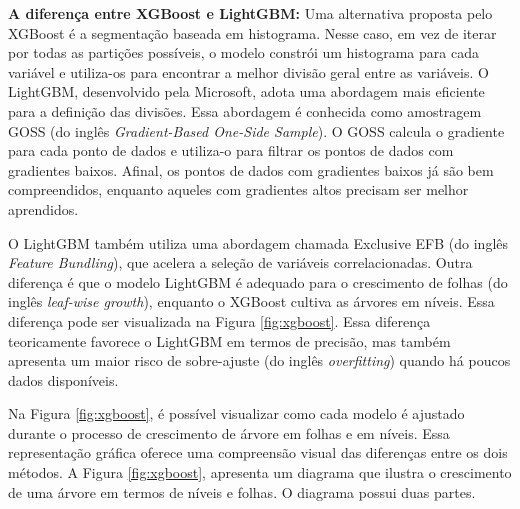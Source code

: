 \noindent\textbf{A diferen\c ca entre XGBoost e LightGBM:}
Uma alternativa proposta pelo XGBoost é a segmentação baseada em histograma. Nesse caso, em vez de iterar por todas as partições possíveis, o modelo constrói um histograma para cada variável e utiliza-os para encontrar a melhor divisão geral entre as variáveis.
O LightGBM, desenvolvido pela Microsoft, adota uma abordagem mais eficiente para a definição das divisões. Essa abordagem é conhecida como amostragem GOSS (do inglês \textit{Gradient-Based One-Side Sample}). O GOSS calcula o gradiente para cada ponto de dados e utiliza-o para filtrar os pontos de dados com gradientes baixos. Afinal, os pontos de dados com gradientes baixos já são bem compreendidos, enquanto aqueles com gradientes altos precisam ser melhor aprendidos.

O LightGBM também utiliza uma abordagem chamada Exclusive EFB (do inglês \textit{Feature Bundling}), que acelera a seleção de variáveis correlacionadas. Outra diferença é que o modelo LightGBM é adequado para o crescimento de folhas (do inglês \textit{leaf-wise growth}), enquanto o XGBoost cultiva as árvores em níveis. Essa diferença pode ser visualizada na Figura \ref{fig:xgboost}.
Essa diferença teoricamente favorece o LightGBM em termos de precisão, mas também apresenta um maior risco de sobre-ajuste (do inglês \textit{overfitting}) quando há poucos dados disponíveis. 

Na Figura \ref{fig:xgboost}, é possível visualizar como cada modelo é ajustado durante o processo de crescimento de árvore em folhas e em níveis. Essa representação gráfica oferece uma compreensão visual das diferenças entre os dois métodos. A Figura \ref{fig:xgboost}, apresenta um diagrama que ilustra o crescimento de uma árvore em termos de níveis e folhas. O diagrama possui duas partes.

%

